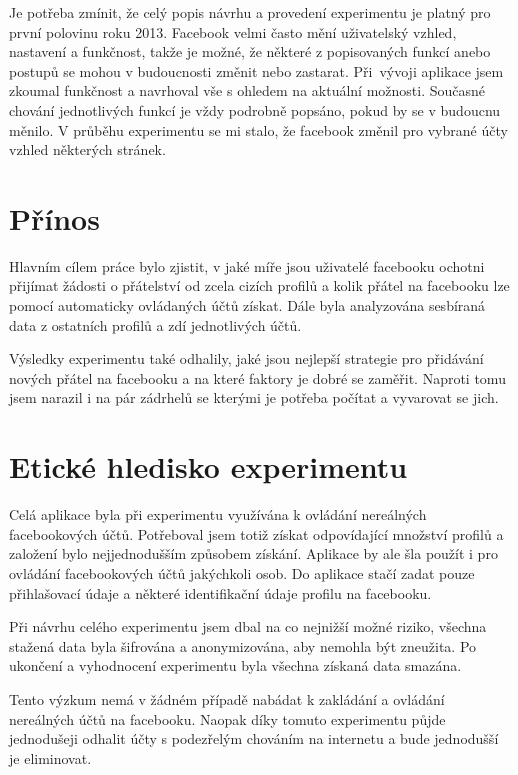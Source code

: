 \documentclass[thesis=M,czech]{FITthesis}[2013/05/10]
\begin{document}
Je potřeba zmínit, že celý popis návrhu a provedení experimentu je platný pro první polovinu roku 2013. Facebook velmi často mění uživatelský vzhled, nastavení a funkčnost, takže je možné, že některé z popisovaných funkcí anebo postupů se mohou v budoucnosti změnit nebo zastarat. Při~vývoji aplikace jsem zkoumal funkčnost a navrhoval vše s ohledem na aktuální možnosti. Současné chování jednotlivých funkcí je vždy podrobně popsáno, pokud by se v budoucnu měnilo. V průběhu experimentu se mi stalo, že facebook změnil pro vybrané účty vzhled některých stránek. 

\section{Přínos}

Hlavním cílem práce bylo zjistit, v jaké míře jsou uživatelé facebooku ochotni přijímat žádosti o přátelství od zcela cizích profilů a kolik přátel na facebooku lze pomocí automaticky ovládaných účtů získat. Dále byla analyzována sesbíraná data z ostatních profilů a zdí jednotlivých účtů.

Výsledky experimentu také odhalily, jaké jsou nejlepší strategie pro přidávání nových přátel na facebooku a na které faktory je dobré se zaměřit. Naproti tomu jsem narazil i na pár zádrhelů se kterými je potřeba počítat a vyvarovat se jich.

\section{Etické hledisko experimentu}

Celá aplikace byla při experimentu využívána k ovládání nereálných facebookových účtů. Potřeboval jsem totiž získat odpovídající množství profilů a založení bylo nejjednodušším způsobem získání. Aplikace by ale šla použít i pro ovládání facebookových účtů jakýchkoli osob. Do aplikace stačí zadat pouze přihlašovací údaje a některé identifikační údaje profilu na facebooku.

Při návrhu celého experimentu jsem dbal na co nejnižší možné riziko, všechna stažená data byla šifrována a anonymizována, aby nemohla být zneužita. Po ukončení a vyhodnocení experimentu byla všechna získaná data smazána. 

Tento výzkum nemá v žádném případě nabádat k zakládání a ovládání nereálných účtů na facebooku. Naopak díky tomuto experimentu půjde jednodušeji odhalit účty s podezřelým chováním na internetu a bude jednodušší je eliminovat.
\end{document}
